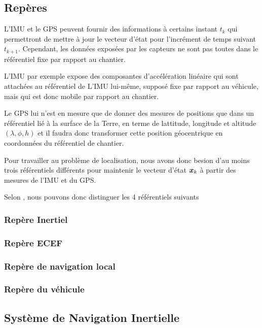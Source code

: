 \documentclass[12pt,a4paper]{report}
\begin{document}
	\subsection{Repères}
	
	\para L'IMU et le GPS peuvent fournir des informations à certains instant $t_k$ qui permettront de mettre à jour le vecteur d'état pour l'incrément de temps suivant $t_{k+1}$. Cependant, les données exposées par les capteurs ne sont pas toutes dans le référentiel fixe par rapport au chantier.
	
	\para L'IMU par exemple expose des composantes d'accélération linéaire qui sont attachées au référentiel de L'IMU lui-même, supposé fixe par rapport au véhicule, mais qui est donc mobile par rapport au chantier.
	
	\para Le GPS lui n'est en mesure que de donner des mesures de positions que dans un référentiel lié à la surface de la Terre, en terme de lattitude, longitude et altitude $(\lambda, \phi, h)$ et il faudra donc transformer cette position géocentrique en coordonnées du référentiel de chantier.
	
	\para Pour travailler au problème de localisation, nous avons donc besion d'au moins trois référentiels différents pour maintenir le vecteur d'état $\boldsymbol{x}_k$ à partir des mesures de l'IMU et du GPS.
	
	\para Selon \cite{gustavsson_uav_2015}, nous pouvons donc distinguer les 4 référentiels suivants
	
	\subsubsection{Repère Inertiel}
	
	\subsubsection{Repère ECEF}
	
	\subsubsection{Repère de navigation local}
	
	\subsubsection{Repère du véhicule}
	
				
	\subsection{Système de Navigation Inertielle}
	
\end{document}
